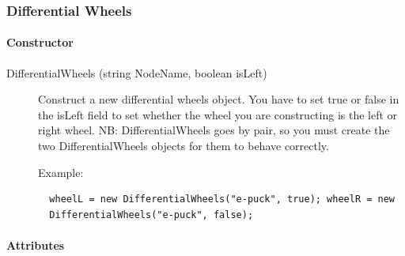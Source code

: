 \subsubsection{Differential Wheels}
\label{webots.uobjects.robotdevices.differentialwheels}%

\paragraph{Constructor}
\label{webots.uobjects.robotdevices.differentialwheels.constructor}%

\noindent
\begin{description}
\item[{DifferentialWheels (string NodeName, boolean isLeft)}]
  Construct a new differential wheels object. You have to set true or
  false in the isLeft field to set whether the wheel you are
  constructing is the left or right wheel.  NB: DifferentialWheels
  goes by pair, so you must create the two DifferentialWheels objects
  for them to behave correctly.

  Example:

\begin{lstlisting}
  wheelL = new DifferentialWheels("e-puck", true); wheelR = new
  DifferentialWheels("e-puck", false);
\end{lstlisting}
\end{description}

\paragraph{Attributes}
\label{webots.uobjects.robotdevices.differentialwheels.attributes}%

